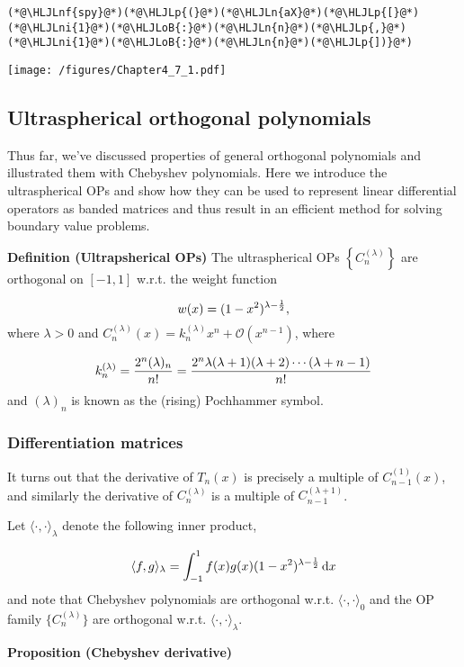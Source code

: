 \documentclass[12pt,a4paper]{article}
\newcommand{\HLJLn}[1]{#1}
\newcommand{\HLJLnf}[1]{\textcolor[RGB]{66,102,213}{#1}}
\newcommand{\HLJLni}[1]{\textcolor[RGB]{59,151,46}{#1}}
\newcommand{\HLJLoB}[1]{\textcolor[RGB]{102,102,102}{\textbf{#1}}}
\newcommand{\HLJLp}[1]{#1}
\begin{document}
\begin{lstlisting}
(*@\HLJLnf{spy}@*)(*@\HLJLp{(}@*)(*@\HLJLn{aX}@*)(*@\HLJLp{[}@*)(*@\HLJLni{1}@*)(*@\HLJLoB{:}@*)(*@\HLJLn{n}@*)(*@\HLJLp{,}@*)(*@\HLJLni{1}@*)(*@\HLJLoB{:}@*)(*@\HLJLn{n}@*)(*@\HLJLp{])}@*)
\end{lstlisting}

\texttt{[image: /figures/Chapter4\_7\_1.pdf]}

\subsection{Ultraspherical orthogonal polynomials}
Thus far, we've discussed properties of general orthogonal polynomials and illustrated them with Chebyshev polynomials.  Here we introduce the ultraspherical OPs and show how they can be used to represent linear differential operators as banded matrices and thus result in an efficient method for solving boundary value problems.

\textbf{Definition (Ultrapsherical OPs)} The ultraspherical OPs $\left\lbrace C_n^{(\lambda)} \right\rbrace$ are orthogonal on $[-1, 1]$ w.r.t. the weight function

\[
w(x) = (1-x^2)^{\lambda - {1\over 2}},
\]
where  $\lambda > 0$ and $C_n^{(\lambda)}(x) = k^{(\lambda)}_{n}x^n + \mathcal{O}(x^{n-1})$, where

\[
k_n^{(\lambda)} = {2^n (\lambda)_n \over n!} = {2^n \lambda (\lambda+1) (\lambda+2) \cdots (\lambda+n-1)  \over n!}
\]
and $(\lambda)_n$ is known as the (rising) Pochhammer symbol.

\subsubsection{Differentiation matrices}
It turns out that the derivative of $T_n(x)$ is precisely a multiple of  $C^{(1)}_{n-1}(x)$, and similarly the derivative of $C_n^{(\lambda)}$ is a multiple of $C_{n-1}^{(\lambda+1)}$.

Let $\langle \cdot, \cdot \rangle_{\lambda}$ denote the following inner product,

\[
\langle f, g \rangle_{\lambda} = \int_{-1}^{1} f(x) g(x) (1-x^2)^{\lambda - \frac{1}{2}}\,{\rm d}x
\]
and note that Chebyshev polynomials are orthogonal w.r.t. $\langle \cdot, \cdot \rangle_{0}$ and the OP family $\{ C_n^{(\lambda)}\}$ are orthogonal w.r.t. $\langle \cdot, \cdot \rangle_{\lambda}$.

\textbf{Proposition (Chebyshev derivative)}
\end{document}
